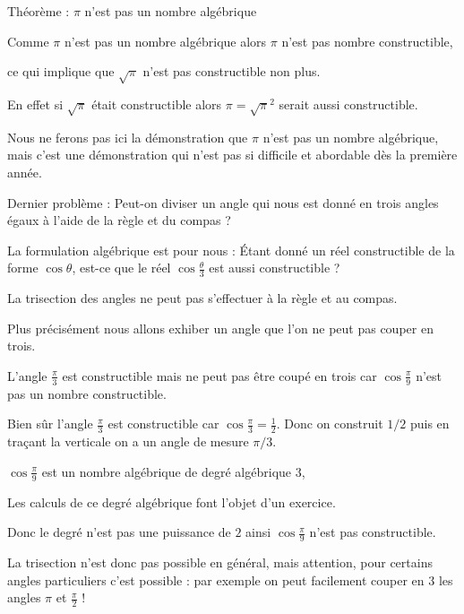 Théorème : $\pi$ n'est pas un nombre algébrique 


Comme $\pi$ n'est pas un nombre algébrique 
alors $\pi$ n'est pas nombre constructible,

\change
ce qui implique que $\sqrt \pi$ n'est pas constructible non plus.

En effet si $\sqrt \pi$ était constructible alors $\pi = \sqrt \pi^2$ serait aussi constructible.


Nous ne ferons pas ici la démonstration que $\pi$ n'est pas un nombre algébrique,
mais c'est une démonstration qui n'est pas si difficile et abordable dès la première année.



\diapo

Dernier problème : 
Peut-on diviser un angle qui nous est donné en trois 
angles égaux à l'aide de la règle et du compas ?

La formulation algébrique est pour nous :
\'Etant donné un réel constructible de la forme $\cos \theta$, 
est-ce que le réel $\cos \frac\theta3$ est aussi constructible ?
  

\diapo

La trisection des angles ne peut pas s'effectuer à la règle et au compas.

\change
Plus précisément nous allons exhiber un angle que l'on ne peut pas couper en trois.

L'angle $\frac{\pi}{3}$ est constructible mais ne peut pas être coupé en trois car 
$\cos \frac \pi 9$ n'est pas un nombre constructible.

\diapo

Bien sûr l'angle $\frac\pi3$ est constructible car $\cos \frac\pi3 = \frac12$.
Donc on construit $1/2$ puis en traçant la verticale on a un angle de mesure $\pi/3$.

\change

$\cos \frac \pi 9$ est un nombre algébrique de degré 
algébrique $3$, 

Les calculs de ce degré algébrique font l'objet d'un exercice.

\change 
Donc le degré n'est pas une puissance de $2$ ainsi 
$\cos \frac \pi 9$ n'est pas constructible.


La trisection n'est donc pas possible en général, mais attention,
pour certains angles particuliers c'est possible : par exemple on peut facilement couper en $3$ les angles $\pi$ et $\frac \pi 2$ !


